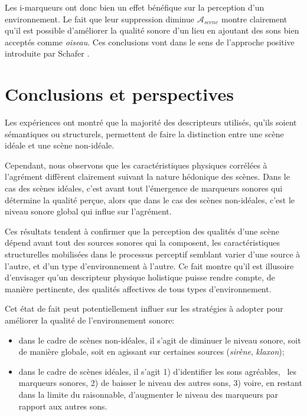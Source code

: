 \documentclass[twoside,twocolumn]{article}
\begin{document}
Les i-marqueurs ont donc bien un effet bénéfique sur la perception d'un environnement. Le fait que leur suppression diminue $\mathcal{A}_{scene}$ montre clairement qu'il est possible d'améliorer la qualité sonore d'un lieu en ajoutant des sons bien acceptés comme \emph{oiseau}. Ces conclusions vont dans le sens de l'approche positive introduite par Schafer \cite{schafer1977tuning}.




\section{Conclusions et perspectives}

Les expériences ont montré que la majorité des descripteurs utilisés, qu'ils soient sémantiques ou structurels, permettent de faire la distinction entre une scène idéale et une scène non-idéale.

Cependant, nous observons que les caractéristiques physiques corrélées à l'agrément diffèrent clairement suivant la nature hédonique des scènes. Dans le cas des scènes idéales, c'est avant tout l'émergence de marqueurs sonores qui détermine la qualité perçue, alors que dans le cas des scènes non-idéales, c'est le niveau sonore global qui influe sur l'agrément.

Ces résultats tendent à confirmer que la perception des qualités d'une scène dépend avant tout des sources sonores qui la composent, les caractéristiques structurelles mobilisées dans le processus perceptif semblant varier d'une source à l'autre, et d'un type d'environnement à l'autre. Ce fait montre qu'il est illusoire d'envisager qu'un descripteur physique holistique puisse rendre compte, de manière pertinente, des qualités affectives de tous types d'environnement.

Cet état de fait peut potentiellement influer sur les stratégies à adopter pour améliorer la qualité de l’environnement sonore:

\begin{itemize}
\item dans le cadre de scènes non-idéales, il s'agit de diminuer le niveau sonore, soit de manière globale, soit en agissant sur certaines sources (\emph{sirène}, \emph{klaxon});
\item dans le cadre de scènes idéales, il s'agit 1) d'identifier les sons agréables, \ie~les marqueurs sonores, 2) de baisser le niveau des autres sons, 3) voire, en restant dans la limite du raisonnable, d'augmenter le niveau des marqueurs par rapport aux autres sons.
\end{itemize}
\end{document}
